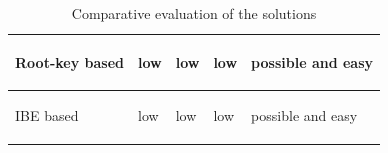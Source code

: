 \documentclass[12pt]{llncs}
\begin{document}
\begin{table}
\begin{center}
\begin{tabular}{ |p{3.5cm}|p{2cm}|p{2cm}|p{2cm}|p{2cm}|  }
\begin{center} Root-key based  \end{center}  & \begin{center} low \end{center} & \begin{center} low \end{center} & \begin{center} low \end{center} & \begin{center} possible and easy \end{center} \\ \hline
\begin{center} IBE based \end{center} & \begin{center} low \end{center} & \begin{center} low \end{center} & \begin{center} low \end{center} & \begin{center} possible and easy \end{center} \\
\hline
\end{tabular}
\vspace{5pt}
\caption{Comparative evaluation of the solutions}
\label{table:comparison}
\end{center}
\end{table}


\end{document}

